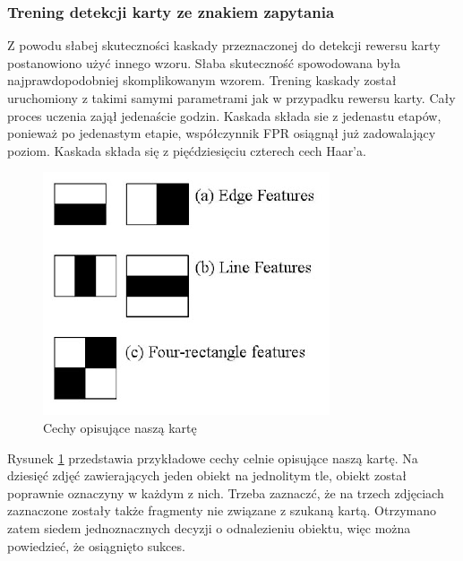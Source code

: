 \subsubsection{Trening detekcji karty ze znakiem zapytania}

Z powodu słabej skuteczności kaskady przeznaczonej do detekcji rewersu karty postanowiono użyć innego wzoru. Słaba skuteczność spowodowana była najprawdopodobniej skomplikowanym wzorem. Trening kaskady został uruchomiony z takimi samymi parametrami jak w przypadku rewersu karty. Cały proces uczenia zajął jedenaście godzin. Kaskada składa sie z jedenastu etapów, ponieważ po jedenastym etapie, współczynnik FPR osiągnął już zadowalający poziom. Kaskada składa się z pięćdziesięciu czterech cech Haar'a.

\begin{figure}[H]
\centering
\includegraphics[scale=0.2]{imgs/cechy?.png}
\caption{Cechy opisujące naszą kartę}
\label{fig:cechy?}
\end{figure}

Rysunek \ref{fig:cechy?} przedstawia przykładowe cechy celnie opisujące naszą kartę. Na dziesięć zdjęć zawierających jeden obiekt na jednolitym tle, obiekt został poprawnie oznaczyny w każdym z nich. Trzeba zaznaczć, że na trzech zdjęciach zaznaczone zostały także fragmenty nie związane z szukaną kartą. Otrzymano zatem siedem jednoznacznych decyzji o odnalezieniu obiektu, więc można powiedzieć, że osiągnięto sukces.
